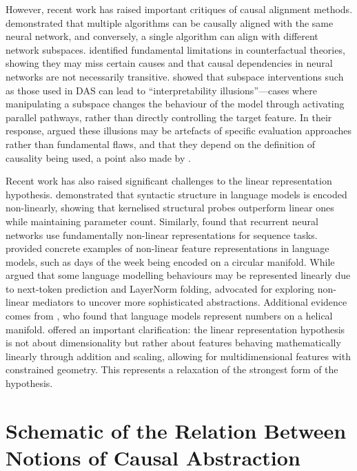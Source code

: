 However, recent work has raised important critiques of causal alignment methods. \citet{meloux2025everything} demonstrated that multiple algorithms can be causally aligned with the same neural network, and conversely, a single algorithm can align with different network subspaces. 
\citet{Mueller2024MissedCA} identified fundamental limitations in counterfactual theories, showing they may miss certain causes and that causal dependencies in neural networks are not necessarily transitive. 
\citet{Makelov2023IsTT} showed that subspace interventions such as those used in DAS can lead to ``interpretability illusions''---cases where manipulating a subspace changes the behaviour of the model through activating parallel pathways, rather than directly controlling the target feature.
In their response, \citet{wu2024replymakelovetal} argued these illusions may be artefacts of specific evaluation approaches rather than fundamental flaws, and that they depend on the definition of causality being used, a point also made by \citet{Jorgensen2025WhatIC}.

Recent work has also raised significant challenges to the linear representation hypothesis. \citet{white-etal-2021-non} demonstrated that syntactic structure in language models is encoded non-linearly, showing that kernelised structural probes outperform linear ones while maintaining parameter count. 
Similarly, \citet{Csordas2024RecurrentNN} found that recurrent neural networks use fundamentally non-linear representations for sequence tasks. \citet{Engels2024NotAL} provided concrete examples of non-linear feature representations in language models, such as days of the week being encoded on a circular manifold. While \citet{Golechha2024ChallengesIM} argued that some language modelling behaviours may be represented linearly due to next-token prediction and LayerNorm folding, \citet{mueller2024questrightmediatorhistory} advocated for exploring non-linear mediators to uncover more sophisticated abstractions. 
Additional evidence comes from \citet{kantamneni2025languagemodelsusetrigonometry}, who found that language models represent numbers on a helical manifold. 
\citet{olah2024linear} offered an important clarification: the linear representation hypothesis is not about dimensionality but rather about features behaving mathematically linearly through addition and scaling, allowing for multidimensional features with constrained geometry.
This represents a relaxation of the strongest form of the hypothesis.

\section{Schematic of the Relation Between Notions of Causal Abstraction} \label{app:visualization_causal_abstraction}

